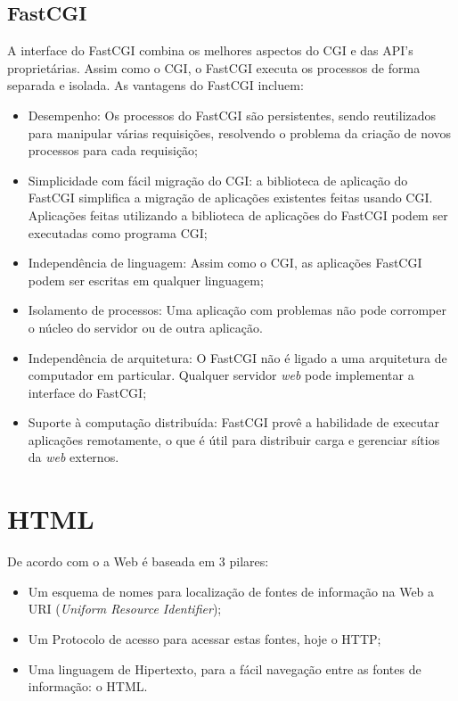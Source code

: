 \subsection{FastCGI}

A interface do FastCGI combina os melhores aspectos do CGI e das API's 
proprietárias. Assim como o CGI, o FastCGI executa os processos de forma 
separada e isolada. As vantagens do FastCGI incluem:

\begin{itemize}
	\item Desempenho: Os processos do FastCGI são persistentes, sendo 
	reutilizados para manipular várias requisições, resolvendo o problema da 
	criação de novos processos para cada requisição;
	\item Simplicidade com fácil migração do CGI: a biblioteca de aplicação do FastCGI simplifica a migração de aplicações existentes feitas usando CGI. Aplicações feitas utilizando a biblioteca de aplicações do FastCGI podem ser executadas como programa CGI;
	\item Independência de linguagem: Assim como o CGI, as aplicações FastCGI 
	podem ser escritas em qualquer linguagem;
	\item Isolamento de processos: Uma aplicação com problemas não pode 
	corromper o núcleo do servidor ou de outra aplicação.
	\item Independência de arquitetura: O FastCGI não é ligado a uma arquitetura de computador em particular. Qualquer servidor \textit{web} pode implementar a interface do FastCGI;
	\item Suporte à computação distribuída: FastCGI provê a habilidade de 
	executar aplicações remotamente, o que é útil para distribuir carga e 
	gerenciar sítios da \textit{web} externos.
\end{itemize}

\section{HTML}

De acordo com o  a Web é baseada em 3 pilares:

\begin{itemize}
	\item Um esquema de nomes para localização de fontes de informação na Web a 
	URI 
	(\textit{Uniform Resource Identifier});
	\item Um Protocolo de acesso para acessar estas fontes, hoje o HTTP;
	\item Uma linguagem de Hipertexto, para a fácil navegação entre as fontes 
	de informação: o HTML.
\end{itemize}

